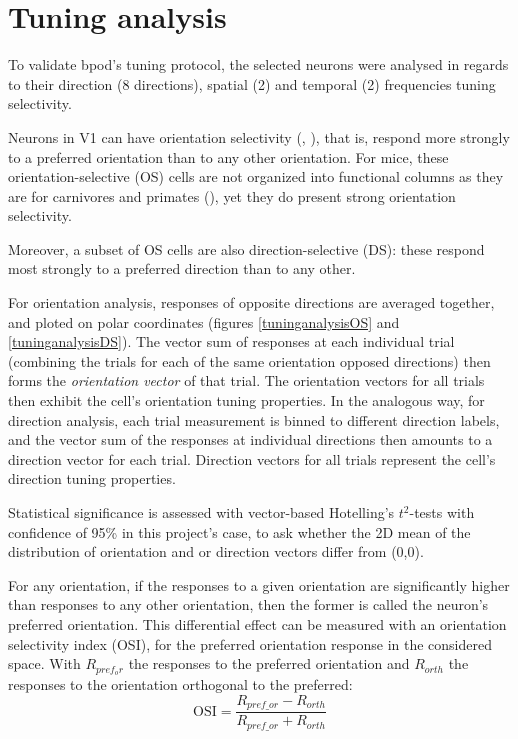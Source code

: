 \section{Tuning analysis}
\label{tuningresults}

To validate bpod's tuning protocol, the selected neurons were analysed in regards to their direction (8 directions), spatial (2) and temporal (2) frequencies tuning selectivity.

Neurons in V1 can have orientation selectivity (\cite{Hubel1959}, \cite{Hubel1962}), that is, respond more strongly to a preferred orientation than to any other orientation. For mice, these orientation-selective (OS) cells are not organized into functional columns as they are for carnivores and primates (\cite{Hubel1962}), yet they do present strong orientation selectivity.

Moreover, a subset of  OS cells are also direction-selective (DS): these respond most strongly to a preferred direction than to any other.

For orientation analysis, responses of opposite directions are averaged together, and ploted on polar coordinates (figures \ref{tuninganalysisOS} and \ref{tuninganalysisDS}). The vector sum of responses at each individual trial (combining the trials for each of the same orientation opposed directions) then forms the \textit{orientation vector} of that trial. The orientation vectors for all trials then exhibit the cell's orientation tuning properties.
In the analogous way, for direction analysis, each trial measurement is binned to different direction labels, and the vector sum of the responses at individual directions then amounts to a direction vector for each trial. Direction vectors for all trials represent the cell's direction tuning properties.

Statistical significance is assessed with vector-based Hotelling's $t^2$-tests with confidence of 95\% in this project's case, to ask whether the 2D mean of the distribution of orientation and or direction vectors differ from (0,0).
 
 For any orientation, if the responses to a given orientation are significantly higher than responses to any other orientation, then the former is called the neuron's preferred orientation. This differential effect can be measured with an orientation selectivity index (OSI), for the preferred orientation response in the considered space. With  $R_{pref_or}$ the responses to the preferred orientation and $R_{orth}$ the responses to the orientation orthogonal to the preferred:
\begin{equation}
\text{OSI}= \dfrac{R_{pref \_or} - R_{orth}}{R_{pref \_or} + R_{orth}}
\end{equation}

